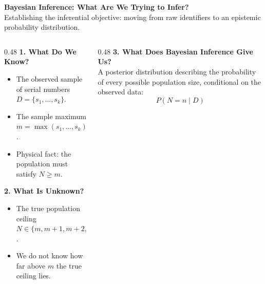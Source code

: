 \documentclass[aspectratio=169,10pt]{beamer}
\begin{document}
\begin{frame}[c]
  \begin{center}
    {\large \textbf{\color{headernavy} Bayesian Inference: What Are We Trying to Infer?}}\\[0.10cm]
    {\scriptsize \color{subgray} Establishing the inferential objective: moving from raw identifiers to an epistemic probability distribution.}
  \end{center}
  \vspace{0.35cm}
  
  \begin{columns}[t,onlytextwidth]
    \begin{column}{0.48\textwidth}
      {\small \textbf{\color{headernavy} 1. What Do We Know?}}\\[0.04cm]
      {\scriptsize
      \begin{itemize}
        \setlength{\itemsep}{0.04cm}
        \item The observed sample of serial numbers $D = \{s_1, \ldots, s_k\}$.
        \item The sample maximum $m = \max(s_1, \ldots, s_k)$.
        \item Physical fact: the population must satisfy $N \ge m$.
      \end{itemize}}
      \vspace{0.14cm}
      
      {\small \textbf{\color{accentred} 2. What Is Unknown?}}\\[0.04cm]
      {\scriptsize
      \begin{itemize}
        \setlength{\itemsep}{0.04cm}
        \item The true population ceiling $N \in \{m, m+1, m+2, \ldots\}$.
        \item We do not know how far above $m$ the true ceiling lies.
      \end{itemize}}
    \end{column}
    
    \begin{column}{0.48\textwidth}
      {\small \textbf{\color{accentblue} 3. What Does Bayesian Inference Give Us?}}\\[0.04cm]
      {\scriptsize A posterior distribution describing the probability of every possible population size, conditional on the observed data:
      \begin{equation*}
        \boxed{P(N = n \mid D)}
      \end{equation*}}
      \vspace{0.06cm}
      

\end{column}
\end{columns}
\end{frame}
\end{document}
